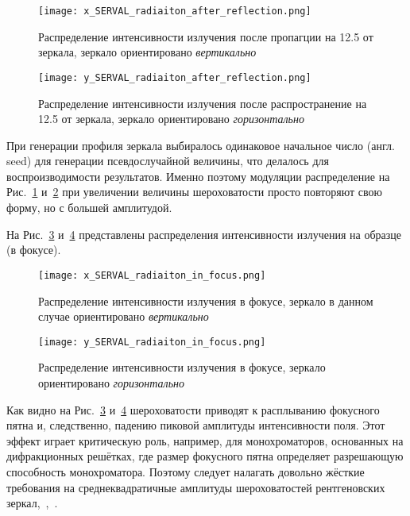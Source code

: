 \begin{figure}[H] 
	\centering 	\texttt{[image: x\_SERVAL\_radiaiton\_after\_reflection.png]}
	\caption{Распределение интенсивности излучения после пропагции на 12.5 от зеркала, зеркало ориентировано \textit{вертикально}}
	\label{fig:x_SERVAL_radiaiton_after_reflection}
\end{figure}

\begin{figure}[H] 
	\centering 	\texttt{[image: y\_SERVAL\_radiaiton\_after\_reflection.png]}
	\caption{Распределение интенсивности излучения после распространение на 12.5 от зеркала, зеркало ориентировано \textit{горизонтально}}
	\label{fig:y_SERVAL_radiaiton_after_reflection}
\end{figure}
\noindent При генерации профиля зеркала выбиралось одинаковое начальное число (англ. seed) для генерации псевдослучайной величины, что делалось для воспроизводимости результатов. Именно поэтому модуляции распределение на Рис.~\ref{fig:x_SERVAL_radiaiton_after_reflection} и~\ref{fig:y_SERVAL_radiaiton_after_reflection} при увеличении величины шероховатости просто повторяют свою форму, но с большей амплитудой.

На Рис.~\ref{fig:x_SERVAL_radiaiton_in_focus} и~\ref{fig:y_SERVAL_radiaiton_in_focus} представлены распределения интенсивности излучения на образце (в фокусе).
\begin{figure}[H] 
	\centering 	\texttt{[image: x\_SERVAL\_radiaiton\_in\_focus.png]}
	\caption{Распределение интенсивности излучения в фокусе, зеркало в данном случае ориентировано \textit{вертикально}}
	\label{fig:x_SERVAL_radiaiton_in_focus}
\end{figure}

\begin{figure}[H] 
	\centering 	\texttt{[image: y\_SERVAL\_radiaiton\_in\_focus.png]}
	\caption{Распределение интенсивности излучения в фокусе, зеркало ориентировано \textit{горизонтально}}
	\label{fig:y_SERVAL_radiaiton_in_focus}
\end{figure}

Как видно на Рис.~\ref{fig:x_SERVAL_radiaiton_in_focus} и~\ref{fig:y_SERVAL_radiaiton_in_focus} шероховатости приводят к расплыванию фокусного пятна и, следственно, падению пиковой амплитуды интенсивности поля. Этот эффект играет критическую роль, например, для монохроматоров, основанных на дифракционных решётках, где размер фокусного пятна определяет разрешающую способность монохроматора. Поэтому следует налагать довольно жёсткие требования на среднеквадратичные амплитуды шероховатостей рентгеновских зеркал,~\cite{strocov_high-resolution_2010},~\cite{sankari_hippie_nodate}. 

